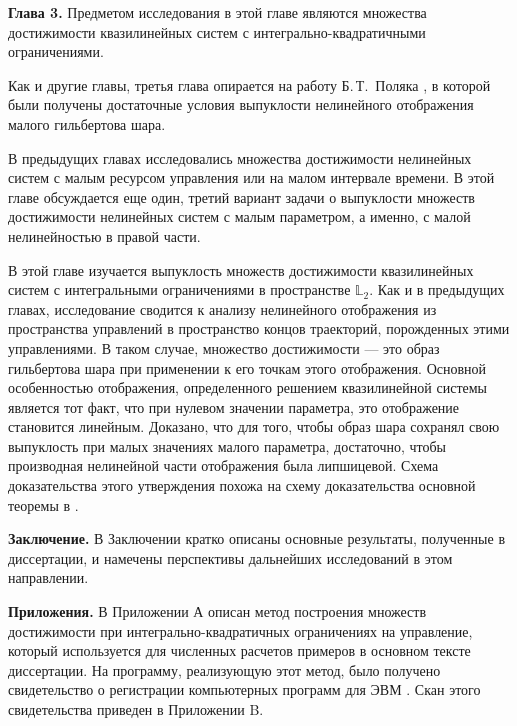 \documentclass[../main.tex]{subfiles}
\begin{document}
\textbf{Глава 3. }
Предметом исследования в этой главе являются множества достижимости квазилинейных систем с интегрально-квадратичными ограничениями.

Как и другие главы, третья глава опирается на работу Б.\,Т.~Поляка \cite{Polyak2001}, в которой были получены достаточные условия выпуклости нелинейного отображения малого гильбертова шара.

В предыдущих главах исследовались множества достижимости нелинейных систем с малым ресурсом управления или на малом интервале времени.
В этой главе обсуждается еще один, третий вариант задачи о выпуклости множеств достижимости нелинейных систем с малым параметром, а именно, с малой нелинейностью в правой части. 

В этой главе изучается выпуклость множеств достижимости квазилинейных систем с интегральными ограничениями в пространстве $\mathbb{L}_2$. 
Как и в предыдущих главах, исследование сводится к анализу нелинейного отображения из пространства управлений в пространство концов траекторий, порожденных этими управлениями.
В таком случае, множество достижимости --- это образ гильбертова шара при применении к его точкам этого отображения. 
Основной особенностью отображения, определенного решением квазилинейной системы является тот факт, что при нулевом значении параметра, это отображение становится линейным.
Доказано, что для того, чтобы образ шара сохранял свою выпуклость при малых значениях малого параметра, достаточно, чтобы производная нелинейной части отображения была липшицевой. 
Схема доказательства этого утверждения похожа на схему доказательства основной теоремы в \cite{Polyak2001}.

\textbf{Заключение. }
В Заключении кратко описаны основные результаты, полученные в диссертации, и намечены перспективы дальнейших исследований в этом направлении.

\textbf{Приложения. }
В Приложении А описан метод построения множеств достижимости при интегрально-квадратичных ограничениях на управление, который используется для численных расчетов примеров в основном тексте диссертации. 
На программу, реализующую этот метод, было получено свидетельство о регистрации компьютерных программ для ЭВМ \cite{Patent}. 
Скан этого свидетельства приведен в Приложении B.
\pagebreak
\end{document}
